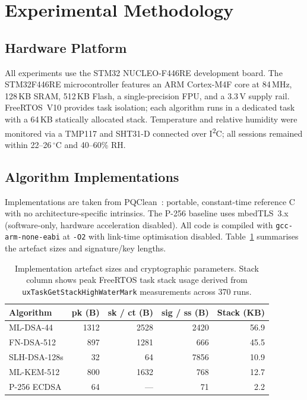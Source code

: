 \documentclass[iicol]{sn-jnl}
\begin{document}
\section{Experimental Methodology}
\label{sec:methodology}

\subsection{Hardware Platform}

All experiments use the STM32 NUCLEO-F446RE development board.
The STM32F446RE microcontroller features an ARM Cortex-M4F core at
84\,MHz, 128\,KB SRAM, 512\,KB Flash, a single-precision FPU, and a
3.3\,V supply rail.
FreeRTOS~V10 provides task isolation; each algorithm runs in a dedicated
task with a 64\,KB statically allocated stack.
Temperature and relative humidity were monitored via a TMP117 and SHT31-D
connected over I\textsuperscript{2}C; all sessions remained within
22--26\,\(^\circ\)C and 40--60\% RH.

\subsection{Algorithm Implementations}

Implementations are taken from PQClean~\cite{pqclean}: portable,
constant-time reference C with no architecture-specific intrinsics.
The P-256 baseline uses mbedTLS~3.x (software-only, hardware acceleration
disabled).
All code is compiled with \texttt{gcc-arm-none-eabi} at \texttt{-O2}
with link-time optimisation disabled.
Table~\ref{tab:impl} summarises the artefact sizes and signature/key lengths.

\begin{table}[t]
\caption{Implementation artefact sizes and cryptographic parameters.
Stack column shows peak FreeRTOS task stack usage derived from
\texttt{uxTaskGetStackHighWaterMark} measurements across 370 runs.}
\label{tab:impl}
\centering
\small
\begin{tabular}{@{}lrrrr@{}}
\toprule
\textbf{Algorithm} & \textbf{pk (B)} & \textbf{sk / ct (B)}
                   & \textbf{sig / ss (B)} & \textbf{Stack (KB)} \\
\midrule
ML-DSA-44    & 1312 & 2528 & 2420 & 56.9 \\
FN-DSA-512   &  897 & 1281 &  666 & 45.5 \\
SLH-DSA-128s &   32 &   64 & 7856 & 10.9 \\
\midrule
ML-KEM-512   &  800 & 1632 &  768 & 12.7 \\
\midrule
P-256 ECDSA  &   64 &  --- &   71 &   2.2 \\
\bottomrule
\end{tabular}
\end{table}
\end{document}
